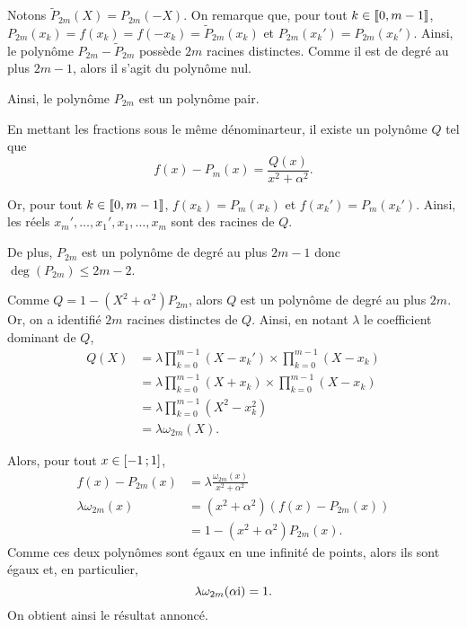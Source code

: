 \begin{solution}
\begin{reponses}
\item Notons $\tilde{P}_{2m}(X) = P_{2m}(-X)$. On remarque que, pour tout $k \in \llbracket0,m-1\rrbracket$, $P_{2m}(x_k) = f(x_k) = f(-x_k) = \tilde{P}_{2m}(x_k)$ et $P_{2m}(x_k') = P_{2m}(x_k')$. Ainsi, le polynôme $P_{2m} - \tilde{P}_{2m}$ possède $2m$ racines distinctes. Comme il est de degré au plus $2 m- 1$, alors il s'agit du polynôme nul.

Ainsi, le polynôme $P_{2m}$ est un polynôme pair.

\item En mettant les fractions sous le même dénominarteur, il existe un polynôme $Q$ tel que
\[
f(x) - P_m(x) = \frac{Q(x)}{x^2 + \alpha^2}.
\]

Or, pour tout $k \in \llbracket0,m-1\rrbracket$, $f(x_k) = P_m(x_k)$ et $f(x_k') = P_m(x_k')$. Ainsi, les réels $x_m',\ldots,x_1',x_1,\ldots,x_m$ sont des racines de $Q$.

De plus, $P_{2m}$ est un polynôme de degré au plus $2 m - 1$ donc $\deg(P_{2m}) \leq 2 m - 2$.

Comme $Q = 1 - (X^2 + \alpha^2) P_{2m}$, alors $Q$ est un polynôme de degré au plus $2m$. Or, on a identifié $2m$ racines distinctes de $Q$. Ainsi, en notant $\lambda$ le coefficient dominant de $Q$,
\begin{align*}
Q(X)
&= \lambda \prod_{k=0}^{m-1} (X - x_k') \times \prod_{k=0}^{m-1} (X - x_k)\\
&= \lambda \prod_{k=0}^{m-1} (X + x_k) \times \prod_{k=0}^{m-1} (X - x_k)\\
&= \lambda \prod_{k=0}^{m-1} (X^2 - x_k^2)\\
&= \lambda \omega_{2m}(X).
\end{align*}

Alors, pour tout $x \in \left[-1\,;1\right]$,
\begin{align*}
f(x) - P_{2m}(x) &= \lambda \frac{\omega_{2m}(x)}{x^2 + \alpha^2}\\
\lambda \omega_{2m}(x) &= (x^2 + \alpha^2) (f(x) - P_{2m}(x))\\
&= 1 - (x^2 + \alpha^2) P_{2m}(x).
\end{align*}
Comme ces deux polynômes sont égaux en une infinité de points, alors ils sont égaux et, en particulier,
\[
\lambda \omega_{2m}(\alpha \mathrm{i}) = 1.
\]
On obtient ainsi le résultat annoncé.


\end{reponses}
\end{solution}

